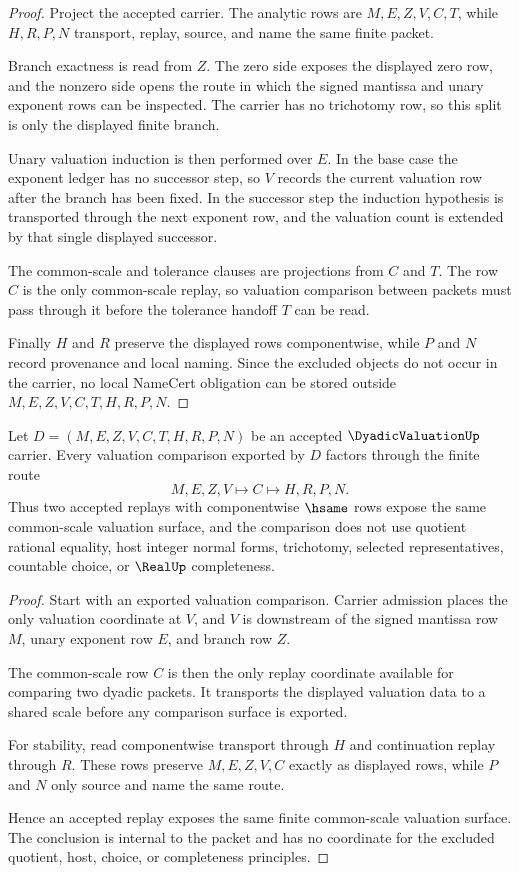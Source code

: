 \begin{proof}
Project the accepted carrier. The analytic rows are $M,E,Z,V,C,T$, while $H,R,P,N$ transport, replay, source, and name the same finite packet.

Branch exactness is read from $Z$. The zero side exposes the displayed zero row, and the nonzero side opens the route in which the signed mantissa and unary exponent rows can be inspected. The carrier has no trichotomy row, so this split is only the displayed finite branch.

Unary valuation induction is then performed over $E$. In the base case the exponent ledger has no successor step, so $V$ records the current valuation row after the branch has been fixed. In the successor step the induction hypothesis is transported through the next exponent row, and the valuation count is extended by that single displayed successor.

The common-scale and tolerance clauses are projections from $C$ and $T$. The row $C$ is the only common-scale replay, so valuation comparison between packets must pass through it before the tolerance handoff $T$ can be read.

Finally $H$ and $R$ preserve the displayed rows componentwise, while $P$ and $N$ record provenance and local naming. Since the excluded objects do not occur in the carrier, no local NameCert obligation can be stored outside $M,E,Z,V,C,T,H,R,P,N$.
\end{proof}

\begin{theorem}
\label{thm:dyadic-valuation-common-scale-stability}
Let $D=(M,E,Z,V,C,T,H,R,P,N)$ be an accepted $\DyadicValuationUp$ carrier. Every valuation comparison exported by $D$ factors through the finite route
$$
M,E,Z,V \longmapsto C \longmapsto H,R,P,N .
$$
Thus two accepted replays with componentwise $\hsame$ rows expose the same common-scale valuation surface, and the comparison does not use quotient rational equality, host integer normal forms, trichotomy, selected representatives, countable choice, or $\RealUp$ completeness.
\end{theorem}
\begin{proof}
Start with an exported valuation comparison. Carrier admission places the only valuation coordinate at $V$, and $V$ is downstream of the signed mantissa row $M$, unary exponent row $E$, and branch row $Z$.

The common-scale row $C$ is then the only replay coordinate available for comparing two dyadic packets. It transports the displayed valuation data to a shared scale before any comparison surface is exported.

For stability, read componentwise transport through $H$ and continuation replay through $R$. These rows preserve $M,E,Z,V,C$ exactly as displayed rows, while $P$ and $N$ only source and name the same route.

Hence an accepted replay exposes the same finite common-scale valuation surface. The conclusion is internal to the packet and has no coordinate for the excluded quotient, host, choice, or completeness principles.
\end{proof}

